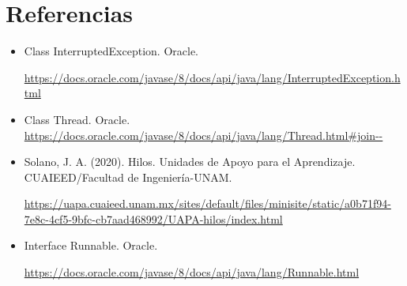 \documentclass{article}
\begin{document}
\section{Referencias}
\begin{itemize}
    \item Class InterruptedException. Oracle.
    
    \url{https://docs.oracle.com/javase/8/docs/api/java/lang/InterruptedException.html}
    
    \item Class Thread. Oracle. \url{https://docs.oracle.com/javase/8/docs/api/java/lang/Thread.html#join--}
    
    \item Solano, J. A. (2020). Hilos. Unidades de Apoyo para el Aprendizaje. CUAIEED/Facultad de Ingeniería-UNAM.
    
    \url{https://uapa.cuaieed.unam.mx/sites/default/files/minisite/static/a0b71f94-7e8c-4cf5-9bfc-cb7aad468992/UAPA-hilos/index.html}

    \item Interface Runnable. Oracle. 
    
    \url{https://docs.oracle.com/javase/8/docs/api/java/lang/Runnable.html}
\end{itemize}
\end{document}
